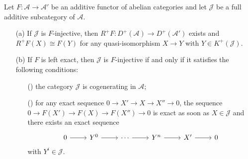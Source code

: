 \begin{proposition}\label{derived category F-injective subcat iff}
Let $F:\mathcal{A}\to\mathcal{A}'$ be an additive functor of abelian categories and let $\mathcal{J}$ be a full additive subcategory of $\mathcal{A}$.
\begin{enumerate}
    \item[(a)] If $\mathcal{J}$ is $F$-injective, then $R^+F:D^+(\mathcal{A})\to D^+(\mathcal{A}')$ exists and $R^+F(X)\cong F(Y)$ for any quasi-isomorphism $X\to Y$ with $Y\in K^+(\mathcal{J})$.
    \item[(b)] If $F$ is left exact, then $\mathcal{J}$ is $F$-injective if and only if it satisfies the following conditions:
    \begin{enumerate}
        \item[(\rmnum{1})] the category $\mathcal{J}$ is cogenerating in $\mathcal{A}$;
        \item[(\rmnum{2})] for any exact sequence $0\to X'\to X\to X''\to 0$, the sequence $0\to F(X')\to F(X)\to F(X'')\to 0$ is exact as soon as $X\in\mathcal{J}$ and there exists an exact sequence
        \[\begin{tikzcd}
        0\ar[r]&Y^0\ar[r]&\cdots\ar[r]&Y^n\ar[r]&X'\ar[r]&0
        \end{tikzcd}\]
        with $Y^i\in\mathcal{J}$.
    \end{enumerate}
\end{enumerate}
\end{proposition}

